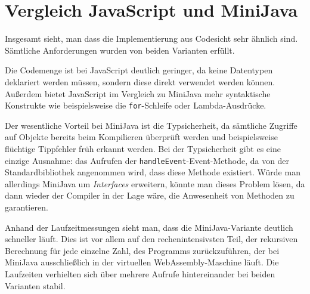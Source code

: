 \section{Vergleich JavaScript und MiniJava}

Insgesamt sieht, man dass die Implementierung aus Codesicht sehr ähnlich sind. Sämtliche Anforderungen wurden von beiden Varianten erfüllt.

Die Codemenge ist bei JavaScript deutlich geringer, da keine Datentypen deklariert werden müssen, sondern diese direkt verwendet werden können. Außerdem bietet JavaScript im Vergleich zu MiniJava mehr syntaktische Konstrukte wie beispielsweise die \lstinline{for}-Schleife oder Lambda-Ausdrücke. 

Der wesentliche Vorteil bei MiniJava ist die Typsicherheit, da sämtliche Zugriffe auf Objekte bereits beim Kompilieren überprüft werden und beispielsweise flüchtige Tippfehler früh erkannt werden. Bei der Typsicherheit gibt es eine einzige Ausnahme: das Aufrufen der \lstinline{handleEvent}-Event-Methode, da von der Standardbibliothek angenommen wird, dass diese Methode existiert. Würde man allerdings MiniJava um \emph{Interfaces} erweitern, könnte man dieses Problem lösen, da dann wieder der Compiler in der Lage wäre, die Anwesenheit von Methoden zu garantieren.

Anhand der Laufzeitmessungen sieht man, dass die MiniJava-Variante deutlich schneller läuft. Dies ist vor allem auf den rechenintensivsten Teil, der rekursiven Berechnung für jede einzelne Zahl, des Programms zurückzuführen, der bei MiniJava ausschließlich in der virtuellen WebAssembly-Maschine läuft. Die Laufzeiten verhielten sich über mehrere Aufrufe hintereinander bei beiden Varianten stabil.
